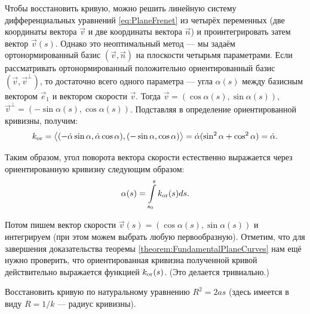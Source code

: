 Чтобы восстановить кривую, можно решить линейную систему дифференциальных уравнений \eqref{eq:PlaneFrenet} из четырёх переменных (две координаты вектора $\vec{v}$ и две координаты вектора $\vec{n}$) и проинтегрировать затем вектор $\vec{v}(s)$. Однако это неоптимальный метод --- мы задаём ортонормированный базис $(\vec{v}, \vec{n})$ на плоскости четырьмя параметрами. Если рассматривать ортонормированный положительно ориентированный базис $(\vec{v}, \vec{v}^{\perp})$, то достаточно всего одного параметра --- угла $\alpha(s)$ между базисным вектором $\vec{e}_1$ и вектором скорости $\vec{v}$. Тогда $\vec{v} = (\cos\alpha(s), \sin\alpha(s))$, $\vec{v}^\perp = (-\sin\alpha(s), \cos\alpha(s))$. Подставляя в определение ориентированной кривизны, получим:
\[
	k_{\mathrm{or}} = \big\langle(-\dot{\alpha}\sin\alpha, \dot{\alpha}\cos\alpha), (-\sin\alpha, \cos\alpha)\big\rangle = \dot{\alpha}(\sin^2\alpha + \cos^2\alpha) = \dot{\alpha}.
\]

Таким образом, угол поворота вектора скорости естественно выражается через ориентированную кривизну следующим образом:
\begin{equation} \label{eq:AngleByCurvature}
	\alpha(s) = \int\limits_{s_0}^sk_{\mathrm{or}}(s)ds.
\end{equation}

Потом пишем вектор скорости $\vec{v}(s) = (\cos\alpha(s), \sin\alpha(s))$ и интегрируем (при этом можем выбрать любую первообразную). Отметим, что для завершения доказательства теоремы \ref{theorem:FundamentalPlaneCurves} нам ещё нужно проверить, что ориентированная кривизна полученной кривой действительно выражается функцией $k_{\mathrm{or}}(s)$. (Это делается тривиально.)

\begin{problem} \label{problem:NaturalEquation}
	Восстановить кривую по натуральному уравнению $R^2 = 2as$ (здесь имеется в виду $R = 1 / k$ --- радиус кривизны).
\end{problem}

